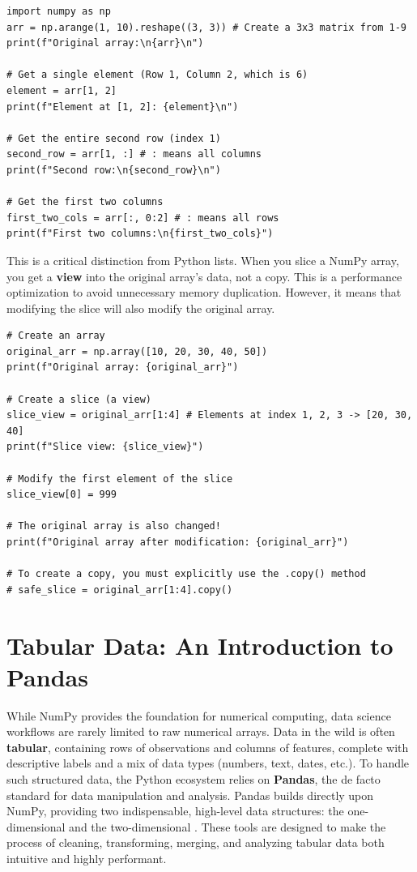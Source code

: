 \begin{example}
\text{ }\begin{verbatim}
import numpy as np
arr = np.arange(1, 10).reshape((3, 3)) # Create a 3x3 matrix from 1-9
print(f"Original array:\n{arr}\n")

# Get a single element (Row 1, Column 2, which is 6)
element = arr[1, 2]
print(f"Element at [1, 2]: {element}\n")

# Get the entire second row (index 1)
second_row = arr[1, :] # : means all columns
print(f"Second row:\n{second_row}\n")

# Get the first two columns
first_two_cols = arr[:, 0:2] # : means all rows
print(f"First two columns:\n{first_two_cols}")
\end{verbatim}
\end{example}

\begin{remark}
This is a critical distinction from Python lists. When you slice a NumPy array, you get a \textbf{view} into the original array's data, not a copy. This is a performance optimization to avoid unnecessary memory duplication. However, it means that modifying the slice will also modify the original array.
\text{ }\begin{verbatim}
# Create an array
original_arr = np.array([10, 20, 30, 40, 50])
print(f"Original array: {original_arr}")

# Create a slice (a view)
slice_view = original_arr[1:4] # Elements at index 1, 2, 3 -> [20, 30, 40]
print(f"Slice view: {slice_view}")

# Modify the first element of the slice
slice_view[0] = 999

# The original array is also changed!
print(f"Original array after modification: {original_arr}")

# To create a copy, you must explicitly use the .copy() method
# safe_slice = original_arr[1:4].copy()
\end{verbatim}
\end{remark}

\section{Tabular Data: An Introduction to Pandas}
\label{sec:pandas_intro}
While NumPy provides the foundation for numerical computing, data science workflows are rarely limited to raw numerical arrays. Data in the wild is often \textbf{tabular}, containing rows of observations and columns of features, complete with descriptive labels and a mix of data types (numbers, text, dates, etc.). To handle such structured data, the Python ecosystem relies on \textbf{Pandas}, the de facto standard for data manipulation and analysis. Pandas builds directly upon NumPy, providing two indispensable, high-level data structures: the one-dimensional \textbf{} and the two-dimensional \textbf{}. These tools are designed to make the process of cleaning, transforming, merging, and analyzing tabular data both intuitive and highly performant.

